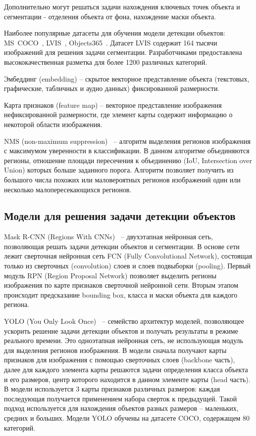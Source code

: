 \documentclass[a4paper,14pt]{article}
\begin{document}
    Дополнительно могут решаться задачи нахождения ключевых точек объекта и сегментации - отделения объекта от фона, нахождение маски объекта.

    Наиболее популярные датасеты для обучения модели детекции объектов: MS~COCO~\cite{COCO}, LVIS~\cite{LVIS}, Objects365~\cite{Objects365}.
    Датасет LVIS содержит 164 тысячи изображений для решения задачи сегментации. Разработчиками предоставлена высококачественная разметка для более 1200 различных категорий.

    Эмбеддинг (embedding) -- скрытое векторное представление объекта (текстовых, графические, табличных и аудио данных) фиксированной размерности.

    Карта признаков (feature map) -- векторное представление изображения нефиксированной размерности, где элемент карты содержит информацию о некоторой области изображения.

    NMS (non-maximum suppression)~\cite{neubeck2006efficient} -- алгоритм выделения регионов изображения с максимумом уверенности в классификации.
    В данном алгоритме объединяются регионы, отношение площади пересечения к объединению (IoU, Intersection over Union) которых больше заданного порога.
    Алгоритм позволяет получить из большого числа похожих или маловероятных регионов изображений один или несколько малопересекающихся регионов.

    \subsection{Модели для решения задачи детекции объектов}

    Mask R-CNN (Regions With CNNs)~\cite{MaskRCNN} -- двухэтапная нейронная сеть, позволяющая решать задачи детекции объектов и сегментации. В основе сети лежит сверточная нейронная сеть FCN (Fully Convolutional Network), состоящая только из сверточных (convolution) слоев и слоев подвыборки (pooling). Первый модуль RPN (Region Proposal Network) позволяет выделить регионы изображения по карте признаков сверточной нейронной сети. Вторым этапом происходит предсказание bounding box, класса и маски объекта для каждого региона.

    YOLO (You Only Look Once)~\cite{redmon2016you} -- семейство архитектур моделей, позволяющее ускорить решение задачи детекции объектов и получать результаты в режиме реального времени.
    Это одноэтапная нейронная сеть, не использующая модуль для выделения регионов изображения.
    В модели сначала получают карты признаков для изображения с помощью сверточных слоев (backbone часть), далее для каждого элемента карты решаются задачи определения класса объекта и его размеров, центр которого находится в данном элементе карты (head часть).
    В модели используется 3 карты признаков различных размеров: каждая последующая получается применением набора сверток к предыдущей.
    Такой подход используется для нахождения объектов разных размеров -- маленьких, средних и больших.
    Модели YOLO обучены на датасете COCO, содержащем 80 категорий.
\end{document}
